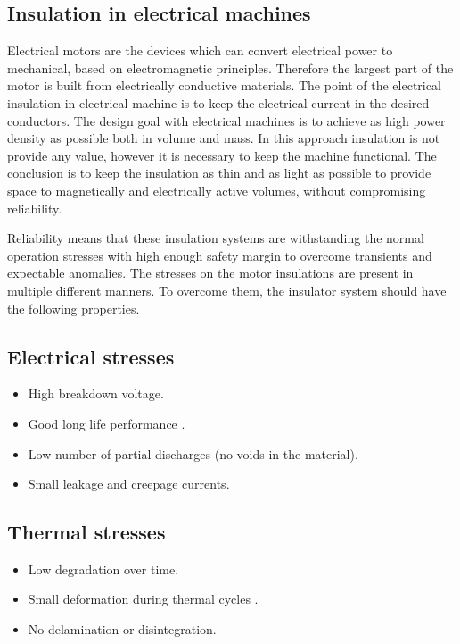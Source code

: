 \subsection{Insulation in electrical machines}

Electrical motors are the devices which can convert electrical power to mechanical, based on electromagnetic principles. Therefore the largest part of the motor is built from electrically conductive materials. The point of the electrical insulation in electrical machine is to keep the electrical current in the desired conductors. The design goal with electrical machines is to achieve as high power density as possible both in volume and mass. In this approach insulation is not provide any value, however it is necessary to keep the machine functional. The conclusion is to keep the insulation as thin and as light as possible to provide space to magnetically and electrically active volumes, without compromising reliability.

Reliability means that these insulation systems are withstanding the normal operation stresses with high enough safety margin to overcome transients and expectable anomalies. The stresses on the motor insulations are present in multiple different manners. To overcome them, the insulator system should have the following properties.

\subsection*{Electrical stresses}
\begin{itemize}
	\item High breakdown voltage.
	\item Good long life performance .
	\item Low number of partial discharges (no voids in the material).
	\item Small leakage and creepage currents.
\end{itemize}

\subsection*{Thermal stresses}
\begin{itemize}
	\item Low degradation over time.
	\item Small deformation during thermal cycles .
	\item No delamination or disintegration.
\end{itemize}

